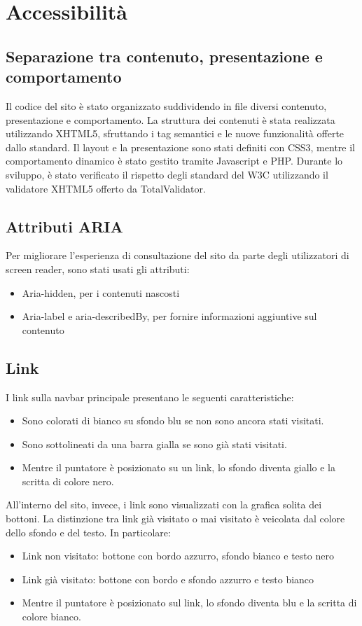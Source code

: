 \section{Accessibilità}
\subsection{Separazione tra contenuto, presentazione e comportamento}
Il codice del sito è stato organizzato suddividendo in file diversi contenuto, presentazione e comportamento. La struttura dei contenuti è stata realizzata utilizzando XHTML5, sfruttando i tag semantici e le nuove funzionalità offerte dallo standard. Il layout e la presentazione sono stati definiti con CSS3, mentre il comportamento dinamico è stato gestito tramite Javascript e PHP. Durante lo sviluppo, è stato verificato il rispetto degli standard del W3C utilizzando il validatore XHTML5 offerto da TotalValidator.
\subsection{Attributi ARIA}
Per migliorare l'esperienza di consultazione del sito da parte degli utilizzatori di screen reader, sono stati usati gli attributi:
\begin{itemize}
    \item Aria-hidden, per i contenuti nascosti
    \item Aria-label e aria-describedBy, per fornire informazioni aggiuntive sul contenuto
\end{itemize}
\subsection{Link}
I link sulla navbar principale presentano le seguenti caratteristiche:
\begin{itemize}
    \item Sono colorati di bianco su sfondo blu se non sono ancora stati visitati.
    \item Sono sottolineati da una barra gialla se sono già stati visitati.
    \item Mentre il puntatore è posizionato su un link, lo sfondo diventa giallo e la scritta di colore nero.
\end{itemize}
All'interno del sito, invece, i link sono visualizzati con la grafica solita dei bottoni. La distinzione tra link già visitato o mai visitato è veicolata dal colore dello sfondo e del testo. In particolare:
\begin{itemize}
    \item Link non visitato: bottone con bordo azzurro, sfondo bianco e testo nero 
    \item Link già visitato: bottone con bordo e sfondo azzurro e testo bianco
    \item Mentre il puntatore è posizionato sul link, lo sfondo diventa blu e la scritta di colore bianco.
\end{itemize}
